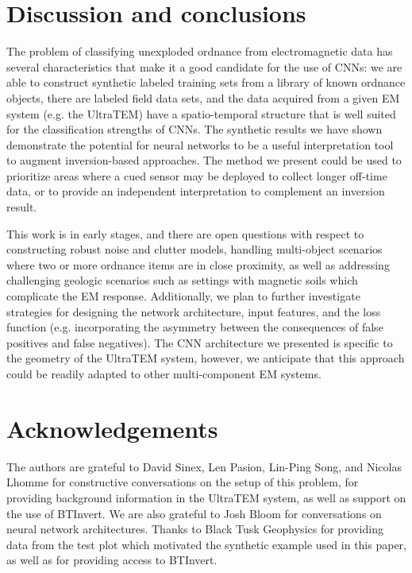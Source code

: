 \documentclass{segabs}
\begin{document}
\section{Discussion and conclusions}

The problem of classifying unexploded ordnance from electromagnetic data has several characteristics that make it a good candidate for the use of CNNs: we are able to construct synthetic labeled training sets from a library of known ordnance objects, there are labeled field data sets, and the data acquired from a given EM system (e.g. the UltraTEM) have a spatio-temporal structure that is well suited for the classification strengths of CNNs. The synthetic results we have shown demonstrate the potential for neural networks to be a useful interpretation tool to augment inversion-based approaches. The method we present could be used to prioritize areas where a cued sensor may be deployed to collect longer off-time data, or to provide an independent interpretation to complement an inversion result.

This work is in early stages, and there are open questions with respect to constructing robust noise and clutter models, handling multi-object scenarios where two or more ordnance items are in close proximity, as well as addressing challenging geologic scenarios such as settings with magnetic soils which complicate the EM response. Additionally, we plan to further investigate strategies for designing the network architecture, input features, and the loss function (e.g. incorporating the asymmetry between the consequences of false positives and false negatives). The CNN architecture we presented is specific to the geometry of the UltraTEM system, however, we anticipate that this approach could be readily adapted to other multi-component EM systems.

\section{Acknowledgements}

The authors are grateful to David Sinex, Len Pasion, Lin-Ping Song, and Nicolas Lhomme for constructive conversations on the setup of this problem, for providing background information in the UltraTEM system, as well as support on the use of BTInvert. We are also grateful to Josh Bloom for conversations on neural network architectures.
Thanks to Black Tusk Geophysics for providing data from the test plot which motivated the synthetic example used in this paper, as well as for providing access to BTInvert.

\onecolumn



\end{document}
